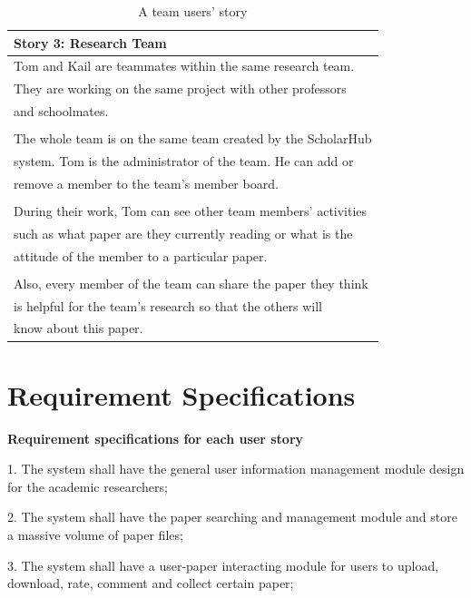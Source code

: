 \documentclass[sigconf, nonacm]{../tex_template/acmart}
\begin{document}
\begin{table}[h!]
	\begin{tabular}{ l }
		\hline
		\textbf{Story 3: Research Team}                               \\
		\hline
		Tom and Kail are teammates within the same research team.     \\
		They are working on the same project with other professors    \\
		and schoolmates.                                              \\
		\\
		The whole team is on the same team created by the ScholarHub  \\
		system. Tom is the administrator of the team. He can add or   \\
		remove a member to the team's member board.                   \\
		\\
		During their work, Tom can see other team members' activities \\
		such as what paper are they currently reading or what is the  \\
		attitude of the member to a particular paper.                 \\
		\\
		Also, every member of the team can share the paper they think \\
		is helpful for the team's research so that the others will    \\
		know about this paper.                                        \\
		\hline
	\end{tabular}
	\caption{A team users' story}
	\label{table:3}
\end{table}


\section{Requirement Specifications}
\textbf{Requirement specifications for each user story}

1. The system shall have the general user information management module design for the academic researchers;

2. The system shall have the paper searching and management module and store a massive volume of paper files;

3. The system shall have a user-paper interacting module for users to upload, download, rate, comment and collect certain paper;
\end{document}
